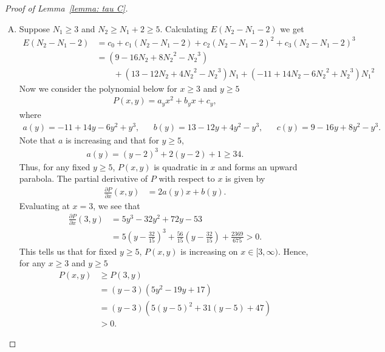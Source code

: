 \documentclass[10pt,a4paper]{amsart}
\begin{document}
\begin{proof}[Proof of Lemma~\ref{lemma: tau C}]
\begin{enumerate}[A.]
			\item 
			Suppose $N_1\geq3$ and $N_2\geq N_1+2\geq5$. Calculating $E(N_2-N_1-2)$ we get
			{
				\begin{align*}
					E(N_2-N_1-2)
					&=c_0+c_1(N_2-N_1-2)+c_2(N_2-N_1-2)^2+c_3(N_2-N_1-2)^3 \\
					&=(9-16{N_2}+8{N_2}^2-{N_2}^3)\\
					&\qquad+(13-12{N_2}+4{N_2}^2-{N_2}^3){N_1}+(-11+14{N_2}-6{N_2}^2+{N_2}^3){N_1}^2
				\end{align*}
			}
			Now we consider the polynomial below for $x\geq3$ and $y\geq5$ 
			\begin{align*}
				P(x, y) = a_y x^2+b_y x+c_y,
			\end{align*}
			where
			\begin{align*}
				a(y) = -11+14y-6y^2+y^3, &&
				b(y) = 13-12y+4y^2-y^3, &&
				c(y) = 9-16y+8y^2-y^3.
			\end{align*}
			Note that $a$ is increasing and that for $y\geq5$,
			\begin{align*}
				a(y)=(y-2)^3+2(y-2)+1\geq34.
			\end{align*}
			Thus, for any fixed $y\geq5$, $P(x, y)$ is quadratic in $x $ and forms an upward parabola. The partial derivative of $P$ with respect to $x$ is given by
			\begin{align*}
				\frac{\partial P}{\partial x}(x,y)&=2a(y)x+b(y).
			\end{align*}
			Evaluating at $x=3$, we see that
			\begin{align*}
				\frac{\partial P}{\partial x}(3,y)
				&=5y^3-32y^2+72y-53 \\
				&=5\left(y-\frac{32}{15}\right)^3+\frac{56}{15}\left(y-\frac{32}{15}\right)+\frac{2369}{675}>0.
			\end{align*}
			This tells us that for fixed $y\geq 5$, $P(x,y)$ is increasing on $x\in[3,\infty)$. Hence, for any $x\geq3$ and $y\geq5$
			\begin{align*}
				P(x,y)
				&\geq P(3,y) \\
				&=(y-3) (5 y^2-19 y+17) \\
				&=(y-3)\left(5 (y-5)^2+31 (y-5)+47\right) \\
				&>0.
			\end{align*}
			
		\end{enumerate}
	\end{proof}
\end{document}
